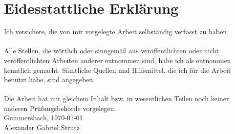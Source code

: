 \chapter*{Eidesstattliche Erklärung}

Ich versichere, die von mir vorgelegte Arbeit selbständig verfasst zu haben.\\ \\
Alle Stellen, die wörtlich oder sinngemäß aus veröffentlichten oder nicht veröffentlichten Arbeiten anderer entnommen sind, habe ich als entnommen kenntlich gemacht. Sämtliche Quellen und Hilfsmittel, die ich für die Arbeit benutzt habe, sind angegeben.\\ \\
Die Arbeit hat mit gleichem Inhalt bzw. in wesentlichen Teilen noch keiner anderen Prüfungsbehörde vorgelegen.
\vspace{1.5cm}
\\
Gummersbach, \today
\vspace{3cm}
\\
Alexander Gabriel Strutz